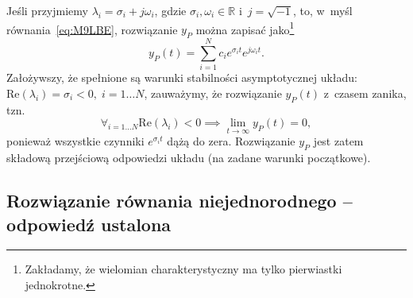 \documentclass[paper=a4,DIV=12]{lpas}
\begin{document}
Jeśli przyjmiemy $\lambda_i = \sigma_i + j \omega_i$, gdzie $\sigma_i,
\omega_i \in \mathbb{R}$ i~$j = \sqrt{-1}$, to, w~myśl
równania~\eqref{eq:M9LBE}, rozwiązanie $y_P$ można zapisać
jako\footnote{Zakładamy, że wielomian charakterystyczny ma tylko pierwiastki
jednokrotne.}
\begin{equation}
  y_P(t) = \sum_{i = 1}^{N} c_i e^{\sigma_i t} e^{j \omega_i t}.
  \label{eq:GS278}
\end{equation}
Założywszy, że spełnione są warunki stabilności asymptotycznej układu:
$\mathrm{Re}\left({\lambda_i}\right) = \sigma_i < 0, \; i = 1 \dots N$,
zauważymy, że rozwiązanie $y_P(t)$ z~czasem zanika, tzn.
\begin{equation}
  \forall_{i = 1 \dots N}{\mathrm{Re}\left(\lambda_i\right) < 0}
  \implies
  \lim_{t \to \infty}{y_P(t)} = 0,
  \label{eq:AZ6A8}
\end{equation}
ponieważ wszystkie czynniki $e^{\sigma_i t}$ dążą do zera. Rozwiązanie $y_P$
jest zatem składową przejściową odpowiedzi układu (na zadane warunki
początkowe).

\subsection{Rozwiązanie równania niejednorodnego -- odpowiedź ustalona}
\label{sec:JITWY}
\end{document}
